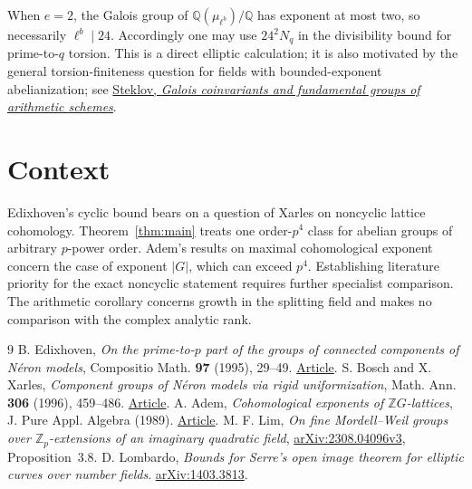\documentclass[11pt]{article}
\begin{document}
When $e=2$, the Galois group of $\mathbb Q(\mu_{\ell^b})/\mathbb Q$
has exponent at most two, so necessarily $\ell^b\mid24$.
Accordingly one may use $24^2 N_q$ in the divisibility bound for
prime-to-$q$ torsion. This is a direct elliptic calculation;
it is also motivated by the general torsion-finiteness question for
fields with bounded-exponent abelianization; see \href{https://arxiv.org/abs/2610.16760}{Steklov, \emph{Galois coinvariants and fundamental groups of arithmetic schemes}}.


\section{Context}
Edixhoven's cyclic bound bears on a question of Xarles on noncyclic
lattice cohomology. Theorem~\ref{thm:main} treats one order-$p^4$
class for abelian groups of arbitrary $p$-power order. Adem's results
on maximal cohomological exponent \cite{Adem} concern the case of
exponent $|G|$, which can exceed $p^4$. Establishing literature priority
for the exact noncyclic statement requires further specialist comparison.
The arithmetic corollary concerns growth in the splitting field and
makes no comparison with the complex analytic rank.

\begin{thebibliography}{9}
 B. Edixhoven, \emph{On the prime-to-$p$ part of the
groups of connected components of N\'eron models}, Compositio Math.
\textbf{97} (1995), 29--49.
\href{https://www.numdam.org/item/CM_1995__97_1-2_29_0/}{Article}.
 S. Bosch and X. Xarles,
\emph{Component groups of N\'eron models via rigid uniformization},
Math. Ann. \textbf{306} (1996), 459--486.
\href{https://mat.uab.es/~xarles/components.pdf}{Article}.
 A. Adem, \emph{Cohomological exponents of
$\mathbb ZG$-lattices}, J. Pure Appl. Algebra (1989).
\href{https://doi.org/10.1016/0022-4049(89)90048-0}{Article}.
 M. F. Lim, \emph{On fine Mordell--Weil groups over
$\mathbb Z_p$-extensions of an imaginary quadratic field},
\href{https://arxiv.org/pdf/2308.04096v3}{arXiv:2308.04096v3},
Proposition~3.8.
 D. Lombardo, \emph{Bounds for Serre's open image theorem for elliptic curves over number fields}. \href{https://arxiv.org/abs/1403.3813}{arXiv:1403.3813}.
\end{thebibliography}
\end{document}
